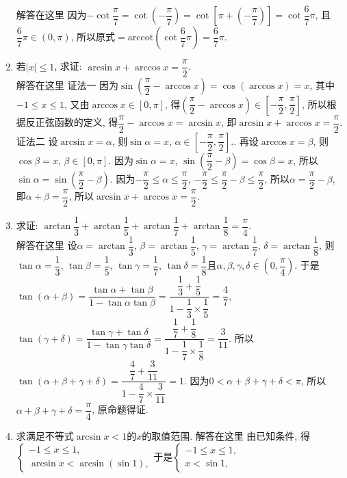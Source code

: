 \documentclass[10pt,a4paper]{article}
\begin{document}
\begin{enumerate}[1.]
解答在这里 因为$-\cot \dfrac{\pi }7=\cot (-\dfrac{\pi }7)=\cot [\pi +(-\dfrac{\pi }7)]=\cot \dfrac 67\pi$, 且$\dfrac 67\pi \in (0,\pi)$, 所以原式$=\mathrm{arccot} (\cot \dfrac 67\pi)=\dfrac 67\pi$.
\item 若$|x|\le 1$, 求证: $\arcsin x+\arccos x=\dfrac{\pi }2$.\\
解答在这里 证法一  因为$\sin (\dfrac{\pi }2-\arccos x)=\cos (\arccos x)=x$, 其中$-1\le x\le 1$,
又由$\arccos x\in [0,\pi]$, 得$(\dfrac{\pi }2-\arccos x)\in [-\dfrac{\pi }2,\dfrac{\pi }2]$,
所以根据反正弦函数的定义, 得$\dfrac{\pi }2-\arccos x=\arcsin x$, 即$\arcsin x+\arccos x=\dfrac{\pi }2$.\\
证法二  设$\arcsin x=\alpha$, 则$\sin \alpha =x$, $\alpha \in [-\dfrac{\pi }2,\dfrac{\pi }2]$..
再设$\arccos x=\beta$, 则$\cos \beta =x$, $\beta \in [0,\pi]$.
因为$\sin \alpha =x$, $\sin (\dfrac{\pi }2-\beta)=\cos \beta =x$, 所以$\sin \alpha =\sin (\dfrac{\pi }2-\beta)$.
因为$-\dfrac{\pi }2\le \alpha \le \dfrac{\pi }2$, $-\dfrac{\pi }2\le \dfrac{\pi }2-\beta \le \dfrac{\pi }2$, 所以$\alpha =\dfrac{\pi }2-\beta$,
即$\alpha +\beta =\dfrac{\pi }2$, 所以$\arcsin x+\arccos x=\dfrac{\pi }2$.
\item 求证: $\arctan \dfrac 13+\arctan \dfrac 15+\arctan \dfrac 17+\arctan \dfrac 18=\dfrac{\pi }4$.\\
解答在这里  设$\alpha =\arctan \dfrac 13$, $\beta =\arctan \dfrac 15$, $\gamma =\arctan \dfrac 17$, $\delta =\arctan \dfrac 18$,
则$\tan \alpha =\dfrac 13$, $\tan \beta =\dfrac 15$, $\tan \gamma =\dfrac 17$, $\tan \delta =\dfrac 18$且$\alpha ,\beta ,\gamma ,\delta \in (0,\dfrac{\pi }4)$.
于是$\tan (\alpha +\beta)=\dfrac{\tan \alpha +\tan \beta }{1-\tan \alpha \tan \beta }=\dfrac{\dfrac 13+\dfrac 15}{1-\dfrac 13\times \dfrac 15}=\dfrac 47$,
$\tan (\gamma +\delta)=\dfrac{\tan \gamma +\tan \delta }{1-\tan \gamma \tan \delta }=\dfrac{\dfrac 17+\dfrac 18}{1-\dfrac 17\times \dfrac 18}=\dfrac 3{11}$.
所以$\tan (\alpha +\beta +\gamma +\delta)=\dfrac{\dfrac 47+\dfrac 3{11}}{1-\dfrac 47\times \dfrac 3{11}}=1$.
因为$0<\alpha +\beta +\gamma +\delta <\pi$, 所以$\alpha +\beta +\gamma +\delta =\dfrac{\pi }4$, 原命题得证.
\item 求满足不等式$\arcsin x<1$的$x$的取值范围.
解答在这里 由已知条件, 得$\begin{cases} -1\le x\le 1, \\ \arcsin x<\arcsin (\sin 1), \end{cases}$于是$\begin{cases} -1\le x\le 1, \\ x<\sin 1, \end{cases}$

\end{enumerate}
\end{document}
